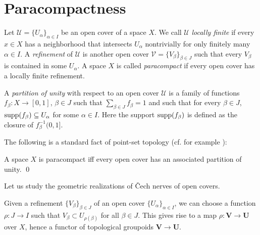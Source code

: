 \documentclass[a4paper,openany]{scrbook}
\begin{document}
\section{Paracompactness}\label{sec:paracompactness}

\begin{defn}
Let $\mathcal U = \{U_\alpha\}_{\alpha \in I}$ be an open cover of a space $X$. We call $\mathcal U$ \emph{locally finite} if every $x \in X$ has a neighborhood that intersects $U_\alpha$ nontrivially for only finitely many $\alpha \in I$. A \emph{refinement} of $\mathcal U$ is another open cover $\mathcal V = \{V_\beta\}_{\beta \in J}$ such that every $V_\beta$ is contained in some $U_\alpha$. A space $X$ is called \emph{paracompact} if every open cover has a locally finite refinement.

A \emph{partition of unity} with respect to an open cover $\mathcal U$ is a family of functions $f_\beta\colon X \to [0,1]$, $\beta \in J$ such that $\sum_{\beta \in J} f_{\beta} = 1$ and such that for every $\beta \in J$, $\operatorname{supp}(f_\beta) \subseteq U_\alpha$ for some $\alpha \in I$. Here the support $\operatorname{supp}(f_\beta)$ is defined as the closure of $f_\beta^{-1}(0,1]$.
\end{defn}

The following is a standard fact of point-set topology (cf. for example \cite[Chapter I.12]{bredon:topology-geometry}):

\begin{prop}
A space $X$ is paracompact iff every open cover has an associated partition of unity. \qed
\end{prop}

Let us study the geometric realizations of \v Cech nerves of open covers. 

Given a refinement $\{V_\beta\}_{\beta \in J}$ of an open cover $\{U_\alpha\}_{\alpha \in I}$, we can choose a function $\rho\colon J \to I$ such that $V_\beta \subset U_{\rho(\beta)}$ for all $\beta \in J$. This gives rise to a map $\rho\colon \mathbf V \to \mathbf U$ over $X$, hence a functor of topological groupoids $\mathbf V \to \mathbf U$.
\end{document}
